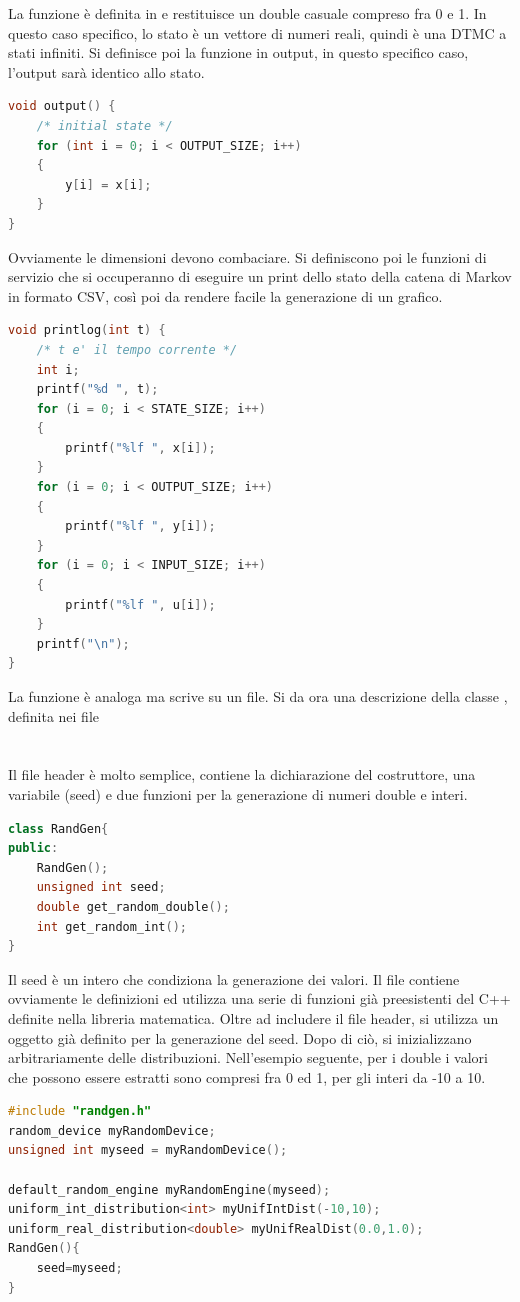 \documentclass[10pt, letterpaper]{report}
\begin{document}
La funzione  è definita in  e restituisce un double casuale compreso fra 0 e 1. In questo caso specifico, lo stato è un vettore di numeri reali, quindi è una DTMC a stati infiniti. Si definisce poi la funzione in output, in questo specifico caso, l'output sarà identico allo stato.
\begin{lstlisting}[style=CppStyle,language=C++]
void output() {
    /* initial state */
    for (int i = 0; i < OUTPUT_SIZE; i++)
    {
        y[i] = x[i];
    }
}
\end{lstlisting}
Ovviamente le dimensioni devono combaciare. Si definiscono poi le funzioni di servizio che 
si occuperanno di eseguire un print dello stato della catena di Markov in formato CSV, così poi 
da rendere facile la generazione di un grafico.
\begin{lstlisting}[style=CppStyle,language=C++]
void printlog(int t) {
    /* t e' il tempo corrente */
    int i;
    printf("%d ", t);
    for (i = 0; i < STATE_SIZE; i++)
    {
        printf("%lf ", x[i]);
    }
    for (i = 0; i < OUTPUT_SIZE; i++)
    {
        printf("%lf ", y[i]);
    }
    for (i = 0; i < INPUT_SIZE; i++)
    {
        printf("%lf ", u[i]);
    }
    printf("\n");
} 
\end{lstlisting}
La funzione  è analoga ma scrive su un file.\acc 
Si da ora una descrizione della classe , definita nei file\\
\\ 
\\
Il file header è molto semplice, contiene la dichiarazione del costruttore, una variabile (seed) e due funzioni per la generazione di numeri double e interi.
\begin{lstlisting}[style=CppStyle,language=C++]
class RandGen{
public:
    RandGen();
    unsigned int seed;
    double get_random_double();
    int get_random_int();
}
\end{lstlisting}
Il seed è un intero che condiziona la generazione dei valori. Il file  contiene ovviamente le definizioni ed utilizza una serie di funzioni già preesistenti del C++ definite nella libreria matematica. Oltre ad includere il file header, si utilizza un oggetto già definito per la generazione del seed. Dopo di ciò, si inizializzano arbitrariamente delle distribuzioni. Nell'esempio 
seguente, per i double i valori che possono essere estratti sono compresi fra 0 ed 1, per gli interi da -10 a 10.
\begin{lstlisting}[style=CppStyle,language=C++]
#include "randgen.h"
random_device myRandomDevice;
unsigned int myseed = myRandomDevice();

default_random_engine myRandomEngine(myseed);
uniform_int_distribution<int> myUnifIntDist(-10,10);
uniform_real_distribution<double> myUnifRealDist(0.0,1.0);
RandGen(){
    seed=myseed;
}
\end{lstlisting}
\end{document}
